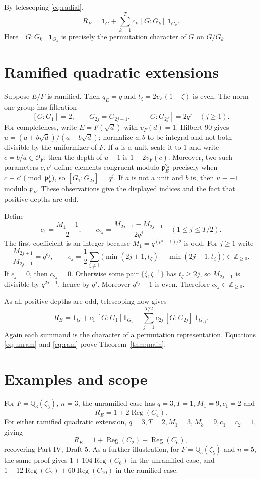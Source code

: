 \documentclass[11pt]{article}
\newcommand{\Ocal}{\mathcal O}
\newcommand{\Z}{\mathbb Z}
\newcommand{\Reg}{\operatorname{Reg}}
\newcommand{\1}{\mathbf 1}
\begin{document}
By telescoping \eqref{eq:radial},
\begin{equation}\label{eq:unram}
 \boxed{R_E=\1_G+\sum_{k=1}^T c_k\,[G:G_k]\,\1_{G_k}.}
\end{equation}
Here $[G:G_k]\,\1_{G_k}$ is precisely the permutation character of $G$ on $G/G_k$.

\section{Ramified quadratic extensions}
Suppose $E/F$ is ramified. Then $q_E=q$ and $t_\zeta=2v_F(1-\zeta)$ is even. The norm-one group has filtration
\[
 [G:G_1]=2,\qquad G_{2j}=G_{2j+1},\qquad [G:G_{2j}]=2q^j\quad(j\geq1).
\]
For completeness, write $E=F(\sqrt d)$ with $v_F(d)=1$. Hilbert 90 gives $u=(a+b\sqrt d)/(a-b\sqrt d)$; normalize $a,b$ to be integral and not both divisible by the uniformizer of $F$. If $a$ is a unit, scale it to $1$ and write $c=b/a\in\Ocal_F$: then the depth of $u-1$ is $1+2v_F(c)$. Moreover, two such parameters $c,c'$ define elements congruent modulo $\mathfrak p_E^{2j}$ precisely when $c\equiv c'\pmod{\mathfrak p_F^j}$, so $[G_1:G_{2j}]=q^j$. If $a$ is not a unit and $b$ is, then $u\equiv-1$ modulo $\mathfrak p_E$. These observations give the displayed indices and the fact that positive depths are odd.

Define
\[
 c_1=\frac{M_1-1}{2},\qquad
 c_{2j}=\frac{M_{2j+1}-M_{2j-1}}{2q^j}\quad(1\leq j\leq T/2).
\]
The first coefficient is an integer because $M_1=q^{(p^a-1)/2}$ is odd. For $j\geq1$ write
\[
 \frac{M_{2j+1}}{M_{2j-1}}=q^{e_j},\qquad
 e_j=\frac12\sum_{\zeta\ne1}\bigl(\min(2j+1,t_\zeta)-\min(2j-1,t_\zeta)\bigr)\in\Z_{\geq0}.
\]
If $e_j=0$, then $c_{2j}=0$. Otherwise some pair $\{\zeta,\zeta^{-1}\}$ has $t_\zeta\geq2j$, so $M_{2j-1}$ is divisible by $q^{2j-1}$, hence by $q^j$. Moreover $q^{e_j}-1$ is even. Therefore $c_{2j}\in\Z_{\geq0}$.

As all positive depths are odd, telescoping now gives
\begin{equation}\label{eq:ram}
\boxed{R_E=\1_G+c_1\,[G:G_1] \1_{G_1}
 +\sum_{j=1}^{T/2}c_{2j}\,[G:G_{2j}]\,\1_{G_{2j}}.}
\end{equation}
Again each summand is the character of a permutation representation. Equations \eqref{eq:unram} and \eqref{eq:ram} prove Theorem~\ref{thm:main}.

\section{Examples and scope}
For $F=\mathbb Q_3(\zeta_3)$, $n=3$, the unramified case has $q=3,T=1,M_1=9,c_1=2$ and
\[
 R_E=1+2\Reg(C_4).
\]
For either ramified quadratic extension, $q=3,T=2,M_1=3,M_3=9,c_1=c_2=1$, giving
\[
 R_E=1+\Reg(C_2)+\Reg(C_6),
\]
recovering Part IV, Draft 5. As a further illustration, for $F=\mathbb Q_5(\zeta_5)$ and $n=5$, the same proof gives $1+104\Reg(C_6)$ in the unramified case, and $1+12\Reg(C_2)+60\Reg(C_{10})$ in the ramified case.
\end{document}
